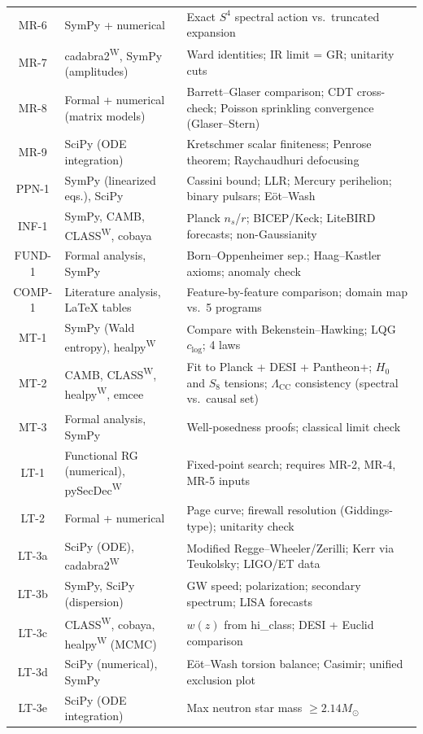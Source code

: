\documentclass[12pt,a4paper]{article}
\begin{document}
\begin{longtable}{clp{6.5cm}}
MR-6 & SymPy + numerical & Exact $S^4$ spectral action vs.\ truncated expansion \\
MR-7 & cadabra2\textsuperscript{W}, SymPy (amplitudes) & Ward identities; IR limit = GR; unitarity cuts \\
MR-8 & Formal + numerical (matrix models) & Barrett--Glaser comparison; CDT cross-check; Poisson sprinkling convergence (Glaser--Stern) \\
MR-9 & SciPy (ODE integration) & Kretschmer scalar finiteness; Penrose theorem; Raychaudhuri defocusing \\
\midrule
PPN-1 & SymPy (linearized eqs.), SciPy & Cassini bound; LLR; Mercury perihelion; binary pulsars; E\"ot--Wash \\
INF-1 & SymPy, CAMB, CLASS\textsuperscript{W}, cobaya & Planck $n_s$/$r$; BICEP/Keck; LiteBIRD forecasts; non-Gaussianity \\
FUND-1 & Formal analysis, SymPy & Born--Oppenheimer sep.; Haag--Kastler axioms; anomaly check \\
COMP-1 & Literature analysis, LaTeX tables & Feature-by-feature comparison; domain map vs.\ 5 programs \\
\midrule
MT-1 & SymPy (Wald entropy), healpy\textsuperscript{W} & Compare with Bekenstein--Hawking; LQG $c_{\log}$; 4 laws \\
MT-2 & CAMB, CLASS\textsuperscript{W}, healpy\textsuperscript{W}, emcee & Fit to Planck + DESI + Pantheon+; $H_0$ and $S_8$ tensions; $\Lambda_{\text{CC}}$ consistency (spectral vs.\ causal set) \\
MT-3 & Formal analysis, SymPy & Well-posedness proofs; classical limit check \\
\midrule
LT-1 & Functional RG (numerical), pySecDec\textsuperscript{W} & Fixed-point search; requires MR-2, MR-4, MR-5 inputs \\
LT-2 & Formal + numerical & Page curve; firewall resolution (Giddings-type); unitarity check \\
LT-3a & SciPy (ODE), cadabra2\textsuperscript{W} & Modified Regge--Wheeler/Zerilli; Kerr via Teukolsky; LIGO/ET data \\
LT-3b & SymPy, SciPy (dispersion) & GW speed; polarization; secondary spectrum; LISA forecasts \\
LT-3c & CLASS\textsuperscript{W}, cobaya, healpy\textsuperscript{W} (MCMC) & $w(z)$ from hi\_class; DESI + Euclid comparison \\
LT-3d & SciPy (numerical), SymPy & E\"ot--Wash torsion balance; Casimir; unified exclusion plot \\
LT-3e & SciPy (ODE integration) & Max neutron star mass $\geq 2.14 M_\odot$ \\
\bottomrule
\end{longtable}
\end{document}
